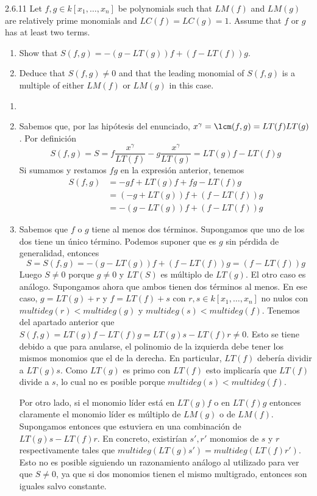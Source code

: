 \documentclass[twoside]{article}
\begin{document}
\begin{ejercicio}{2.6.11}
Let $f , g ∈ k[x_1,\dots , x_n]$ be polynomials such that $LM( f )$ and $LM(g)$ are relatively prime
monomials and $LC( f) = LC(g) = 1$. Assume that $f$ or $g$ has at least two terms.
\begin{enumerate}
\item Show that $S( f , g) = −(g − LT(g))f + (f − LT( f ))g$.
\item Deduce that $S( f , g) \neq 0$ and that the leading monomial of $S( f , g)$ is a multiple of
either $LM( f )$ or $LM(g)$ in this case.
\end{enumerate}
\end{ejercicio}
\begin{solucion}
\begin{enumerate}
\item[]
\item Sabemos que, por las hipótesis del enunciado, $x^\gamma=\lcm(f,g)=LT(f)LT(g)$. Por definición
$$S(f,g)= S=f\frac{x^{\gamma}}{LT(f)}-g\frac{x^{\gamma}}{LT(g)} = LT(g)f-LT(f)g
$$
Si sumamos y restamos $fg$ en la expresión anterior, tenemos
\begin{align*}
S(f,g)&=-gf+LT(g)f +fg-LT(f)g\\
&=(-g+LT(g))f+(f-LT(f))g \\
&=-(g-LT(g))f+(f-LT(f))g
\end{align*}
\item Sabemos que $f$ o $g$ tiene al menos dos términos. Supongamos que uno de los dos tiene un único término. Podemos suponer que es $g$ sin pérdida de generalidad, entonces
$$
S=S(f,g)=-(g-LT(g))f+(f-LT(f))g = (f-LT(f))g 
$$
Luego $S\neq 0$ porque $g\neq 0$ y $LT(S)$ es múltiplo de $LT(g)$. El otro caso es análogo. Supongamos ahora que ambos tienen dos términos al menos. 
En ese caso, $g=LT(g)+r$ y $f=LT(f)+s$ con $r,s\in k[x_1,\dots, x_n]$ no nulos con $multideg(r)<multideg(g)$ y $multideg(s)<multideg(f)$. Tenemos del apartado anterior que $S(f,g)=LT(g)f-LT(f)g=LT(g)s-LT(f)r\neq 0$. Esto se tiene debido a que para anularse, el polinomio de la izquierda debe tener los mismos monomios que el de la derecha. En particular, $LT(f)$ debería dividir a $LT(g)s$. Como $LT(g)$ es primo con $LT(f)$ esto implicaría que $LT(f)$ divide a $s$, lo cual no es posible porque $multideg(s)<multideg(f)$. 

Por otro lado, si el monomio líder está en $LT(g)f$ o en $LT(f)g$ entonces claramente el monomio líder es múltiplo de $LM(g)$ o de $LM(f)$. Supongamos entonces que estuviera en una combinación de $LT(g)s-LT(f)r$. En concreto, existirían $s',r'$ monomios de $s$ y $r$ respectivamente tales que $multideg(LT(g)s')=multideg(LT(f)r')$. Esto no es posible siguiendo un razonamiento análogo al utilizado para ver que $S\neq 0$, ya que si dos monomios tienen el mismo multigrado, entonces son iguales salvo constante. 

\end{enumerate}
\end{solucion}
\end{document}

